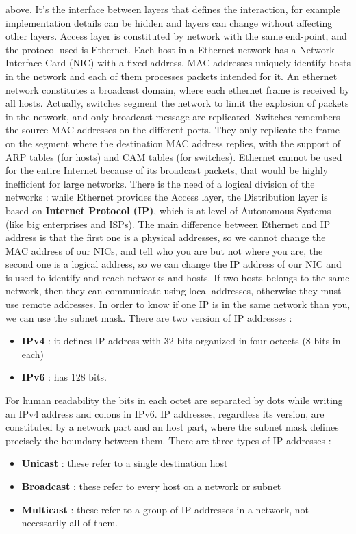 \documentclass[11pt]{article}
\begin{document}
above. It's the interface between layers that defines the interaction, for example implementation details can be hidden and layers can change without affecting other layers. Access layer is constituted by network 
with the same end-point, and the protocol used is Ethernet. Each host in a Ethernet network has a Network Interface Card (NIC) with a fixed address. MAC addresses uniquely identify hosts in the network and each of them processes  packets intended for it. An ethernet network constitutes a broadcast domain, where each ethernet frame is received  by all hosts. Actually, switches segment the network to limit the explosion of packets in the network, and only  broadcast message are replicated. Switches remembers the source MAC addresses on the different ports. They only replicate the frame on the segment where the destination MAC address replies, with the support of ARP tables (for hosts) and CAM tables (for switches). Ethernet cannot be used for the entire Internet because of its broadcast packets, that would be highly inefficient for large networks. There is the need of a logical division of the networks : while Ethernet provides the Access layer, the Distribution layer is based on \textbf{Internet Protocol (IP)}, which is at level of Autonomous Systems (like big enterprises and ISPs). The main difference between Ethernet and IP address is that
the first one is a physical addresses, so we cannot change the MAC address of our NICs, and tell who you are but not where you are, the second one is a logical address, so we can change the IP address of our NIC and is used to identify and reach networks and hosts. If two hosts belongs to the same network, then they can communicate using
local addresses, otherwise they must use remote addresses. In order to know if one IP is in the same network than you, we can use the subnet mask. There are two version of IP addresses :
\begin{itemize}
\item \textbf{IPv4} : it defines IP address with 32 bits organized in four octects (8 bits in each)
\item \textbf{IPv6} : has 128 bits.
\end{itemize}
For human readability the bits in each octet are separated by dots while writing an IPv4 address and colons in IPv6. IP addresses, regardless its version, are constituted by a network part and an host part, where the subnet mask defines precisely the boundary between them. There are three types of IP addresses :
\begin{itemize}
\item \textbf{Unicast} : these refer to a single destination host
\item \textbf{Broadcast} : these refer to every host on a network or subnet
\item \textbf{Multicast} : these refer to a group of IP addresses in a network, not necessarily all of them.
\end{itemize}
\end{document}
